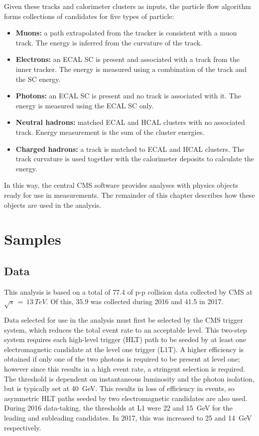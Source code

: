 \newpage
Given these tracks and calorimeter clusters as inputs, the particle flow algorithm forms collections of candidates for five types of particle:
\begin{itemize}
  \item{\textbf{Muons:} a path extrapolated from the tracker is consistent with a muon track. 
                        The energy is inferred from the curvature of the track.}  %
  \item{\textbf{Electrons:} an ECAL SC is present and associated with a track from the inner tracker. 
                            The energy is measured using a combination of the track \pt and the SC energy.}
  \item{\textbf{Photons:} an ECAL SC is present and no track is associated with it.
                          The energy is measured using the ECAL SC only.}
  \item{\textbf{Neutral hadrons:} matched ECAL and HCAL clusters with no associated track.
                                 Energy measurement is the sum of the cluster energies.}
  \item{\textbf{Charged hadrons:} a track is matched to ECAL and HCAL clusters.
                                 The track curvature is used together with the calorimeter deposits to calculate the energy.}
\end{itemize}
In this way, the central CMS software provides analyses with physics objects 
ready for use in measurements.
The remainder of this chapter describes how these objects are used in the \Hgg analysis.

\section{Samples}
\subsection{Data}

This analysis is based on a total of \SI{77.4}{\fbinv} of p-p collision data collected by CMS at $\sqrt{s}\,=\,\SI{13}{TeV}$.
Of this, \SI{35.9}{\fbinv} was collected during 2016 and \SI{41.5}{\fbinv} in 2017.

Data selected for use in the analysis must first be selected by the CMS trigger system, 
which reduces the total event rate to an acceptable level.
This two-step system requires each high-level trigger (HLT) path to be seeded by at least one electromagnetic candidate at the level one trigger (L1T).
A higher efficiency is obtained if only one of the two photons is required to be present at level one; 
however since this results in a high event rate, a stringent \pt selection is required.
The threshold is dependent on instantaneous luminosity and the photon isolation, 
but is typically set at \SI{40}{GeV}.
This results in loss of efficiency in \Hgg events, so asymmetric HLT paths seeded by two electromagnetic candidates are also used.
During 2016 data-taking, the \pt thresholds at L1 were 22 and \SI{15}{GeV} for the leading and subleading candidates.
In 2017, this was increased to 25 and \SI{14}{GeV} respectively. %

